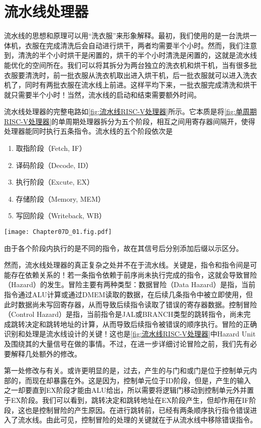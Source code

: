 \section{流水线处理器}

流水线的思想和原理可以用“洗衣服”来形象解释。最初，我们使用的是一台洗烘一体机，衣服在完成清洗后会自动进行烘干，两者均需要半个小时。然而，我们注意到，清洗的半个小时烘干是闲置的，烘干的半个小时清洗是闲置的，这就是流水线能优化的空间所在。我们可以将其拆分为两台独立的洗衣机和烘干机，当有很多批衣服要清洗时，前一批衣服从洗衣机取出进入烘干机，后一批衣服就可以进入洗衣机了，同时有两批衣服在流水线上前进。这样平均下来，一批衣服完成清洗和烘干就只需要半个小时！当然，流水线的启动和结束需要额外时间。

流水线处理器的完整电路如\cref{fig:流水线RISC-V处理器}所示。它本质是将\cref{fig:单周期RISC-V处理器}的单周期处理器拆分为五个阶段，相互之间用寄存器间隔开，使得处理器能同时执行五条指令。流水线的五个阶段依次是
\begin{enumerate}
    \item 取指阶段（Fetch, IF）
    \item 译码阶段（Decode, ID）
    \item 执行阶段（Excute, EX）
    \item 存储阶段（Memory, MEM）
    \item 写回阶段（Writeback, WB）
\end{enumerate}
\begin{Figure}
    \texttt{[image: Chapter07D\_01.fig.pdf]}
\end{Figure}

由于各个阶段内执行的是不同的指令，故在其信号后分别添加后缀以示区分。

然而，流水线处理器的真正复杂之处并不在于流水线。关键是，指令和指令间是可能存在依赖关系的！若一条指令依赖于前序尚未执行完成的指令，这就会导致冒险（Hazard）的发生。冒险主要有两种类型：数据冒险（Data Hazard）是指，当前指令通过ALU计算或通过DMEM读取的数据，在后续几条指令中被立即使用，但此时数据尚未写回寄存器，从而导致后续指令读取了错误的寄存器数据。控制冒险（Control Hazard）是指，当前指令是JAL或BRANCH类型的跳转指令，尚未完成跳转决定和跳转地址的计算，从而导致后续指令被错误的顺序执行。冒险的正确识别和处理是流水线设计的关键！这也是\cref{fig:流水线RISC-V处理器}中Hazard Unit及围绕其的大量信号在做的事情。不过，在进一步详细讨论冒险之前，我们先有必要解释几处额外的修改。

第一处修改与有关。或许更明显的是，过去，产生的与门和或门是位于控制单元内部的，而现在却暴露在外。这是因为，控制单元位于ID阶段，但是，产生的输入之一却要直到EX阶段才能由ALU给出，所以需要将逻辑门移动到控制单元外并置于EX阶段。我们可以看到，跳转决定和跳转地址在EX阶段产生，但却作用在IF阶段，这也是控制冒险的产生原因。在进行跳转前，已经有两条顺序执行指令错误进入了流水线。由此可见，控制冒险的处理的关键就在于从流水线中移除错误指令。

